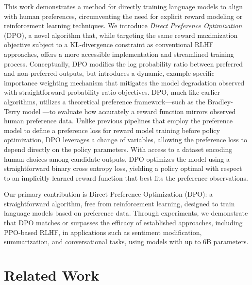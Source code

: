 This work demonstrates a method for directly training language models to align with human preferences, circumventing the need for explicit reward modeling or reinforcement learning techniques. We introduce \textit{Direct Preference Optimization} (DPO), a novel algorithm that, while targeting the same reward maximization objective subject to a KL-divergence constraint as conventional RLHF approaches, offers a more accessible implementation and streamlined training process. Conceptually, DPO modifies the log probability ratio between preferred and non-preferred outputs, but introduces a dynamic, example-specific importance weighting mechanism that mitigates the model degradation observed with straightforward probability ratio objectives. DPO, much like earlier algorithms, utilizes a theoretical preference framework—such as the Bradley-Terry model \cite{bradley1952rankanalysis}—to evaluate how accurately a reward function mirrors observed human preference data. Unlike previous pipelines that employ the preference model to define a preference loss for reward model training before policy optimization, DPO leverages a change of variables, allowing the preference loss to depend directly on the policy parameters. With access to a dataset encoding human choices among candidate outputs, DPO optimizes the model using a straightforward binary cross entropy loss, yielding a policy optimal with respect to an implicitly learned reward function that best fits the preference observations.

Our primary contribution is Direct Preference Optimization (DPO): a straightforward algorithm, free from reinforcement learning, designed to train language models based on preference data. Through experiments, we demonstrate that DPO matches or surpasses the efficacy of established approaches, including PPO-based RLHF, in applications such as sentiment modification, summarization, and conversational tasks, using models with up to 6B parameters.

\section{Related Work}

